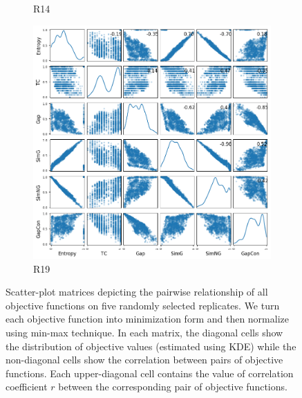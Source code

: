 \begin{figure}[!htbp]
\begin{adjustwidth}{-1cm}{-1cm}
\begin{subfigure}{0.35\textwidth}
			\caption{R14}
		\end{subfigure}
		\begin{subfigure}{0.35\textwidth}
			\includegraphics[width=\columnwidth]{Figure/6-obj-old/R19/fig/scatter_mattrix}
			\caption{R19}
		\end{subfigure}
		\caption{Scatter-plot matrices depicting the pairwise relationship of all objective functions on five randomly selected replicates. We turn each objective function into minimization form and then normalize using min-max technique. In each matrix, the diagonal cells show the distribution of objective values (estimated using KDE) while the non-diagonal cells show the correlation between pairs of objective functions. Each upper-diagonal cell contains the value of correlation coefficient $r$ between the corresponding pair of objective functions.}
		\label{fig:new_nature_obj}
	\end{adjustwidth}
\end{figure}
